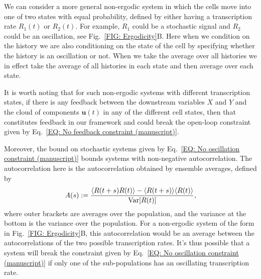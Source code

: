 \documentclass[%
 reprint,
superscriptaddress,
%
%
%
%
%
%
%
%
%
 amsmath,amssymb,
 aps,
%
%
%
%
%
%
onecolumn]{revtex4-2}
\newcommand{\lb}{\langle}
\newcommand{\rb}{\rangle}
\begin{document}
{
We can consider a more general non-ergodic system in which the cells move into one of two states with equal probability, defined by either having a transcription rate $R_{1}(t)$ or $R_{2}(t)$. For example, $R_{1}$ could be a stochastic signal and $R_{2}$ could be an oscillation, see Fig.~\ref{FIG: Ergodicity}B. Here when we condition on the history we are also conditioning on the state of the cell by specifying whether the history is an oscillation or not. When we take the average over all histories we in effect take the average of all histories in each state and then average over each state. }

{
It is worth noting that for such non-ergodic systems with different transcription states, if there is any feedback between the downstream variables $X$ and $Y$ and the cloud of components $\mathbf{u}(t)$ in any of the different cell states, then that constitutes feedback in our framework and could break the open-loop constraint given by Eq.~\eqref{EQ: No feedback constraint (manuscript)}.}

{
Moreover, the bound on stochastic systems given by Eq.~\eqref{EQ: No oscillation constraint (manuscript)} bounds systems with non-negative autocorrelation. The autocorrelation here is the autocorrelation obtained by ensemble averages, defined by 
\begin{equation*}
A(s) : = \frac{\lb R(t+s) R(t) \rb - \lb R(t+s)\rb \lb R(t) \rb}{\Var[R(t)]} ,
\end{equation*}
where outer brackets are averages over the population, and the variance at the bottom is the variance over the population. For a non-ergodic system of the form in Fig.~\ref{FIG: Ergodicity}B, this autocorrelation would be an average between the autocorrelations of the two possible transcription rates. It's thus possible that a system will break the constraint given by Eq.~\eqref{EQ: No oscillation constraint (manuscript)} if only one of the sub-populations has an oscillating transcription rate. }
\end{document}
